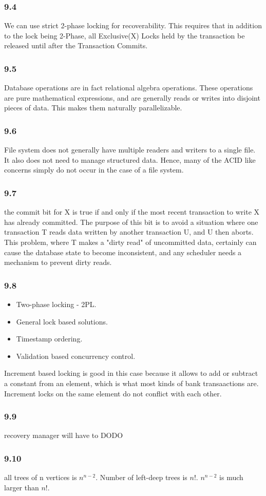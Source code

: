 \documentclass{article}
\begin{document}
\subsubsection{9.4}

We can use strict 2-phase locking for recoverability. This requires that
in addition to the lock being 2-Phase, all Exclusive(X) Locks held by the
transaction be released until after the Transaction Commits.

\subsubsection{9.5}
Database operations are in fact relational algebra operations. These
operations are pure mathematical expressions, and are generally reads or
writes into disjoint pieces of data. This makes them naturally parallelizable.


\subsubsection{9.6}
File system does not generally have multiple readers and writers to a single
file. It also does not need to manage structured data. Hence, many of the ACID
like concerns simply do not occur in the case of a file system.

\subsubsection{9.7}
the commit bit for X is true if and only if the most recent
transaction to write X has already committed. The purpose of this bit
is to avoid a situation where one transaction T reads data written by
another transaction U, and U then aborts. This problem, where T makes
a "dirty read" of uncommitted data, certainly can cause the database
state to become inconsistent, and any scheduler needs a mechanism to
prevent dirty reads.

\subsubsection{9.8}
\begin{itemize}
        \item  Two-phase locking - 2PL.
        \item General lock based solutions.
        \item Timestamp ordering.
        \item Validation based concurrency control.
\end{itemize}

Increment based locking is good in this case because it allows to add or subtract a constant
from an element, which is what most kinds of bank transaactions are. Increment locks on the same
element do not conflict with each other.
\subsubsection{9.9}
recovery manager will have to DODO
\subsubsection{9.10}
all trees of n vertices is $n^{n-2}$. Number of left-deep trees is $n!$.
$n^{n-2}$ is much larger than $n!$.
\end{document}
